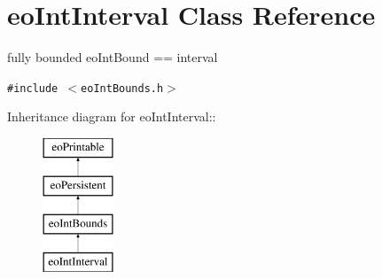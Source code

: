 \section{eo\-Int\-Interval Class Reference}
\label{classeo_int_interval}
fully bounded eo\-Int\-Bound == interval  


{\tt \#include $<$eo\-Int\-Bounds.h$>$}

Inheritance diagram for eo\-Int\-Interval::\begin{figure}[H]
\begin{center}
\leavevmode
\includegraphics[height=4cm]{classeo_int_interval}
\end{center}
\end{figure}
